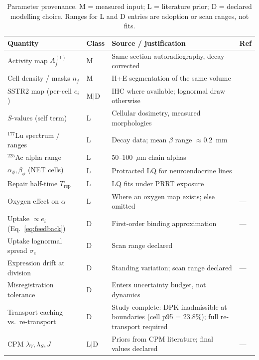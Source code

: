 \documentclass[11pt]{article}
\begin{document}
\begin{table}[t]
\centering
\caption{Parameter provenance. M = measured input; L = literature prior; D = declared
modelling choice. Ranges for L and D entries are adoption or scan ranges, not fits.}
\label{tab:provenance}
\small
\begin{tabularx}{\linewidth}{@{}l l X l@{}}
\toprule
Quantity & Class & Source / justification & Ref \\
\midrule
Activity map $A^{(1)}_j$ & M & Same-section autoradiography, decay-corrected &
\cite{sahota2025,mellhammar2023} \\
Cell density / masks $n_j$ & M & H+E segmentation of the same volume &
\cite{mellhammar2023} \\
SSTR2 map (per-cell $e_i$) & M$|$D & IHC where available; lognormal draw otherwise &
\cite{feijtel2021} \\
$S$-values (self term) & L & Cellular dosimetry, measured morphologies &
\cite{tamborino2020} \\
$^{177}$Lu spectrum / ranges & L & Decay data; mean $\beta$ range $\approx 0.2$~mm &
\cite{ijms2026nanoparticle} \\
$^{225}$Ac alpha range & L & 50--100~$\mu$m chain alphas & \cite{sahota2025} \\
$\alpha_{\phi}, \beta_{\phi}$ (NET cells) & L & Protracted LQ for neuroendocrine lines &
\cite{tamborino2025} \\
Repair half-time $T_{\text{rep}}$ & L & LQ fits under PRRT exposure &
\cite{tamborino2025} \\
Oxygen effect on $\alpha$ & L & Where an oxygen map exists; else omitted &
--- \\
Uptake $\propto e_i$ (Eq.~\ref{eq:feedback}) & D & First-order binding approximation &
--- \\
Uptake lognormal spread $\sigma_e$ & D & Scan range declared &
\cite{feijtel2021,fransson2024} \\
Expression drift at division & D & Standing variation; scan range declared &
--- \\
Misregistration tolerance & D & Enters uncertainty budget, not dynamics &
\cite{albers2021} \\
Transport caching vs.\ re-transport & D & Study complete: DPK inadmissible at
boundaries (cell p95 = 23.8\%); full re-transport required & \cite{kinder2026biofilm} \\
CPM $\lambda_V, \lambda_S, J$ & L$|$D & Priors from CPM literature; final values
declared & --- \\
\bottomrule
\end{tabularx}
\end{table}
\end{document}
